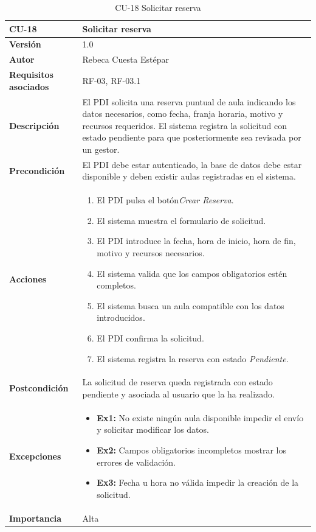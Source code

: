\begin{table}[p]
	\centering
	\begin{tabularx}{\linewidth}{ p{} p{} }
		\toprule
		\textbf{CU-18} & \textbf{Solicitar reserva}\\
		\toprule
		\textbf{Versión} & 1.0 \\
		\textbf{Autor} & Rebeca Cuesta Estépar \\
		\textbf{Requisitos asociados} & RF-03, RF-03.1 \\
		\textbf{Descripción} & El PDI solicita una reserva puntual de aula indicando los datos necesarios, como fecha, franja horaria, motivo y recursos requeridos. El sistema registra la solicitud con estado pendiente para que posteriormente sea revisada por un gestor. \\
		\textbf{Precondición} & El PDI debe estar autenticado, la base de datos debe estar disponible y deben existir aulas registradas en el sistema. \\
		\textbf{Acciones} &
		\begin{enumerate}
			\def\labelenumi{\arabic{enumi}.}
			\tightlist
			\item El PDI pulsa el botón\emph{Crear Reserva}.
			\item El sistema muestra el formulario de solicitud.
			\item El PDI introduce la fecha, hora de inicio, hora de fin, motivo y recursos necesarios.
			\item El sistema valida que los campos obligatorios estén completos.
			\item El sistema busca un aula compatible con los datos introducidos.
			\item El PDI confirma la solicitud.
			\item El sistema registra la reserva con estado \emph{Pendiente}.
		\end{enumerate}\\
		\textbf{Postcondición} & La solicitud de reserva queda registrada con estado pendiente y asociada al usuario que la ha realizado. \\
		\textbf{Excepciones} &
		\begin{itemize}
			\tightlist
			\item \textbf{Ex1:} No existe ningún aula disponible \textrightarrow{} impedir el envío y solicitar modificar los datos.
			\item \textbf{Ex2:} Campos obligatorios incompletos \textrightarrow{} mostrar los errores de validación.
			\item \textbf{Ex3:} Fecha u hora no válida \textrightarrow{} impedir la creación de la solicitud.
		\end{itemize}\\
		\textbf{Importancia} & Alta \\
		\bottomrule
	\end{tabularx}
	\caption{CU-18 Solicitar reserva}
\end{table}

